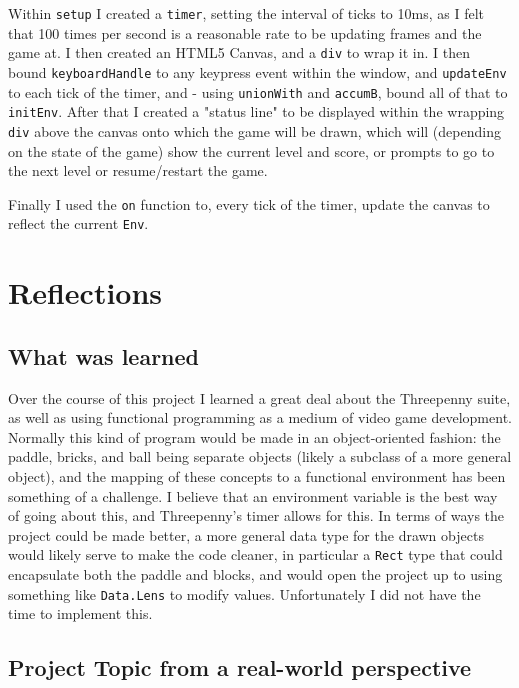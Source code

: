 \documentclass[12pt]{article}
\begin{document}
\par

Within \verb|setup| I created a \verb|timer|, setting the interval of ticks to 10ms, as I felt that 100 times per second is a reasonable rate to be updating frames and the game at.
I then created an HTML5 Canvas, and a \verb|div| to wrap it in.
I then bound \verb|keyboardHandle| to any keypress event within the window, and \verb|updateEnv| to each tick of the timer, and - using \verb|unionWith| and \verb|accumB|, bound all of that to \verb|initEnv|.
After that I created a "status line" to be displayed within the wrapping \verb|div| above the canvas onto which the game will be drawn, which will (depending on the state of the game) show the current level and score, or prompts to go to the next level or resume/restart the game.

\par

Finally I used the \verb|on| function to, every tick of the timer, update the canvas to reflect the current \verb|Env|.

\section{Reflections}

\subsection{What was learned}

Over the course of this project I learned a great deal about the Threepenny suite, as well as using functional programming as a medium of video game development.
Normally this kind of program would be made in an object-oriented fashion: the paddle, bricks, and ball being separate objects (likely a subclass of a more general object), and the mapping of these concepts to a functional environment has been something of a challenge.
I believe that an environment variable is the best way of going about this, and Threepenny's timer allows for this.
In terms of ways the project could be made better, a more general data type for the drawn objects would likely serve to make the code cleaner, in particular a \verb|Rect| type that could encapsulate both the paddle and blocks, and would open the project up to using something like \verb|Data.Lens| to modify values.
Unfortunately I did not have the time to implement this.

\subsection{Project Topic from a real-world perspective}
\end{document}
